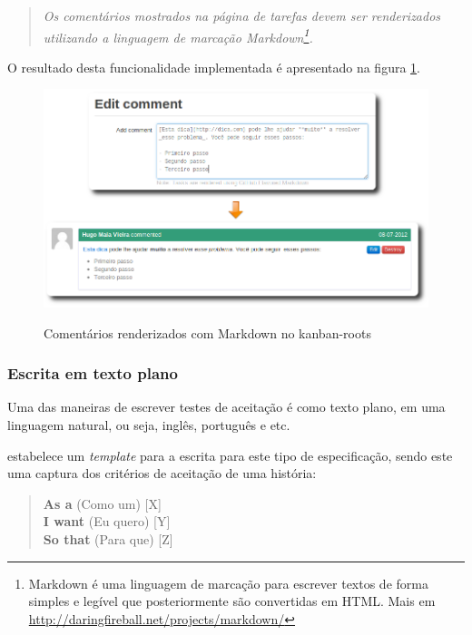 \begin{quote}
\textit{Os comentários mostrados na página de tarefas devem ser renderizados utilizando a linguagem de marcação Markdown\footnote{Markdown é uma linguagem de marcação para escrever textos de forma simples e legível que posteriormente são convertidas em HTML. Mais em \url{http://daringfireball.net/projects/markdown/}}.}
\end{quote}

O resultado desta funcionalidade implementada é apresentado na figura \ref{img:markdown}.

\begin{figure}[h]
  \center
  \caption{Comentários renderizados com Markdown no kanban-roots}
  \includegraphics[scale=0.5]{images/markdown}
  \label{img:markdown}
\end{figure}

\subsubsection{Escrita em texto plano}
\label{ssub:escrita_em_texto_plano}

Uma das maneiras de escrever testes de aceitação é como texto plano, em uma linguagem natural, ou seja, inglês, português e etc.

 estabelece um \textit{template} para a escrita para este tipo de especificação, sendo este uma captura dos critérios de aceitação de uma história:

\begin{quote}
\textbf{As a} (Como um) [X]\\
\textbf{I want} (Eu quero) [Y]\\
\textbf{So that} (Para que) [Z]
\end{quote}

